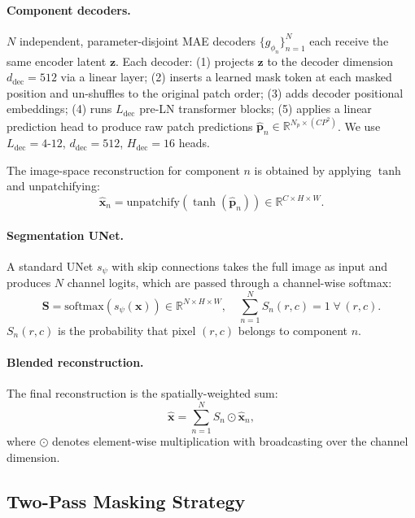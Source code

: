 \documentclass{article}
\newcommand{\RR}{\mathbb{R}}
\newcommand{\bx}{\mathbf{x}}
\newcommand{\bp}{\mathbf{p}}
\begin{document}
\paragraph{Component decoders.}
$N$ independent, parameter-disjoint MAE decoders
$\{g_{\phi_n}\}_{n=1}^{N}$ each receive the same encoder latent $\mathbf{z}$.
Each decoder: (1) projects $\mathbf{z}$ to the decoder dimension
$d_\mathrm{dec} = 512$ via a linear layer; (2) inserts a learned
mask token at each masked position and un-shuffles to the original patch
order; (3) adds decoder positional embeddings; (4) runs
$L_\mathrm{dec}$ pre-LN transformer blocks; (5) applies a linear prediction
head to produce raw patch predictions $\hat{\bp}_n \in \RR^{N_p \times (C P^2)}$.
We use $L_\mathrm{dec}\!=\!4$-$12$, $d_\mathrm{dec}\!=\!512$, $H_\mathrm{dec}\!=\!16$ heads.

The image-space reconstruction for component $n$ is obtained by applying
$\tanh$ and unpatchifying:
\begin{equation}
  \hat{\bx}_n = \mathrm{unpatchify}\!\left(\tanh(\hat{\bp}_n)\right)
  \in \RR^{C \times H \times W}.
\end{equation}

\paragraph{Segmentation UNet.}
A standard UNet $s_\psi$ with skip connections takes the full image as input
and produces $N$ channel logits, which are passed through a channel-wise softmax:
\begin{equation}
  \mathbf{S} = \mathrm{softmax}(s_\psi(\bx)) \in \RR^{N \times H \times W},
  \quad \sum_{n=1}^{N} S_n(r,c) = 1 \;\forall\, (r,c).
\end{equation}
$S_n(r,c)$ is the probability that pixel $(r,c)$ belongs to component $n$.

\paragraph{Blended reconstruction.}
The final reconstruction is the spatially-weighted sum:
\begin{equation}
  \hat{\bx} = \sum_{n=1}^{N} S_n \odot \hat{\bx}_n,
  \label{eq:blend}
\end{equation}
where $\odot$ denotes element-wise multiplication with broadcasting over the channel dimension.

\subsection{Two-Pass Masking Strategy}
\label{sec:twopass}
\end{document}
